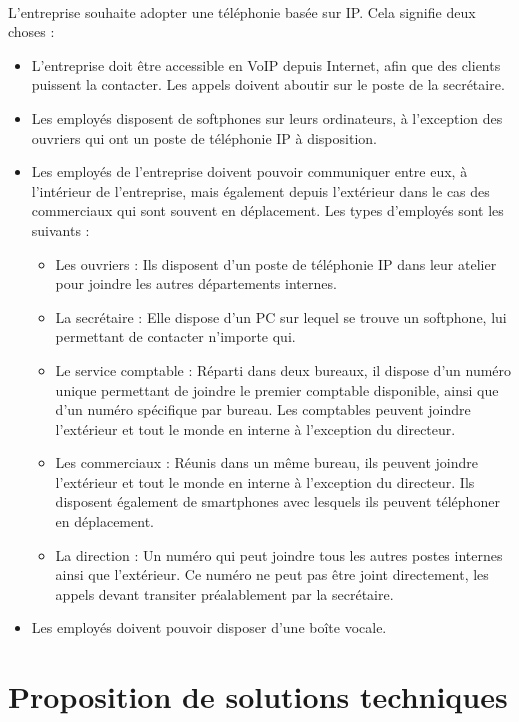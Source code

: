 \documentclass[a4paper,12pt]{article}
\begin{document}
	\paragraph{} L’entreprise souhaite adopter une téléphonie basée sur IP. Cela signifie
deux choses :
 \begin{itemize}
	\item L’entreprise doit être accessible en VoIP depuis Internet, afin que des
clients puissent la contacter. Les appels doivent aboutir sur le poste
de la secrétaire.
	\item Les employés disposent de softphones sur leurs ordinateurs, à l’exception
des ouvriers qui ont un poste de téléphonie IP à disposition.

	\item Les employés de l’entreprise doivent pouvoir communiquer 		entre eux,
à l’intérieur de l’entreprise, mais également depuis l’extérieur dans
le cas des commerciaux qui sont souvent en déplacement. Les types
d’employés sont les suivants :
	\begin{itemize}
		\item Les ouvriers : Ils disposent d’un poste de téléphonie IP dans leur
atelier pour joindre les autres départements internes.

		\item La secrétaire : Elle dispose d’un PC sur lequel se trouve un softphone,
lui permettant de contacter n’importe qui.
		\item Le service comptable : Réparti dans deux bureaux, il dispose d’un numéro unique permettant de joindre le premier comptable disponible,
ainsi que d’un numéro spécifique par bureau. Les comptables
peuvent joindre l'extérieur et tout le monde en interne à
l’exception du directeur.
		\item Les commerciaux : Réunis dans un même bureau, ils peuvent
joindre l’extérieur et tout le monde en interne à l'exception du
directeur. Ils disposent également de smartphones avec lesquels ils
peuvent téléphoner en déplacement.
		\item La direction : Un numéro qui peut joindre tous les autres postes
internes ainsi que l’extérieur. Ce numéro ne peut pas être joint
directement, les appels devant transiter préalablement par la secrétaire.
	\end{itemize}
	\item Les employés doivent pouvoir disposer d’une boîte vocale.
	\end{itemize}
		
	
\section{Proposition de solutions techniques}
\end{document}
